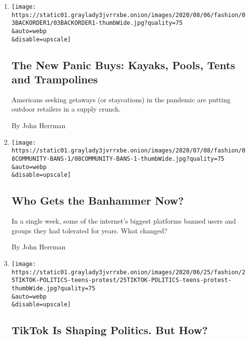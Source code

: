 \begin{enumerate}
\def\labelenumi{\arabic{enumi}.}
\item
  \href{/2020/08/04/style/outdoor-camping-gear-pools-backordered.html}{}

  \texttt{[image: https://static01.graylady3jvrrxbe.onion/images/2020/08/06/fashion/03BACKORDER1/03BACKORDER1-thumbWide.jpg?quality=75\\\&auto=webp\\\&disable=upscale]}

  \hypertarget{the-new-panic-buys-kayaks-pools-tents-and-trampolines}{%
  \subsection{The New Panic Buys: Kayaks, Pools, Tents and
  Trampolines}\label{the-new-panic-buys-kayaks-pools-tents-and-trampolines}}

  Americans seeking getaways (or staycations) in the pandemic are
  putting outdoor retailers in a supply crunch.

  By John Herrman
\item
  \href{/2020/07/11/style/online-communities-social-media-bans-reddit-youtube-twitch-facebook.html}{}

  \texttt{[image: https://static01.graylady3jvrrxbe.onion/images/2020/07/08/fashion/08COMMUNITY-BANS-1/08COMMUNITY-BANS-1-thumbWide.jpg?quality=75\\\&auto=webp\\\&disable=upscale]}

  \hypertarget{who-gets-the-banhammer-now}{%
  \subsection{Who Gets the Banhammer
  Now?}\label{who-gets-the-banhammer-now}}

  In a single week, some of the internet's biggest platforms banned
  users and groups they had tolerated for years. What changed?

  By John Herrman
\item
  \href{/2020/06/28/style/tiktok-teen-politics-gen-z.html}{}

  \texttt{[image: https://static01.graylady3jvrrxbe.onion/images/2020/06/25/fashion/25TIKTOK-POLITICS-teens-protest/25TIKTOK-POLITICS-teens-protest-thumbWide.jpg?quality=75\\\&auto=webp\\\&disable=upscale]}

  \hypertarget{tiktok-is-shaping-politics-but-how}{%
  \subsection{TikTok Is Shaping Politics. But
  How?}\label{tiktok-is-shaping-politics-but-how}}


\end{enumerate}
